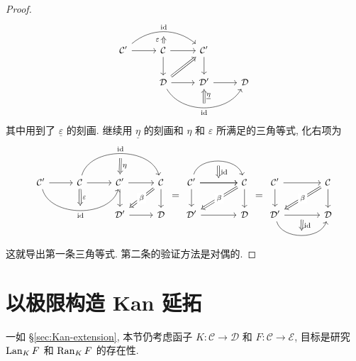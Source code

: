 \begin{proof}
\[\begin{tikzcd}[every cell/.append style = {font = \small}]
		\mathcal{C}' \arrow[r] \arrow[rr, bend left=40, "\identity", ""' {name=T}] & \mathcal{C} \arrow[r] \arrow[d] \arrow[Rightarrow, to=T, "\varepsilon" inner sep=0.4em] & \mathcal{C}' \arrow[d] & \\
 		& \mathcal{D} \arrow[r] \arrow[rr, bend right=60, "\identity"', "" {name=I}] \arrow[Rightarrow, ru] & \mathcal{D}' \arrow[r] \arrow[Rightarrow, from=I, "\underline{\eta}"'] & \mathcal{D}
	\end{tikzcd}\]
	其中用到了 $\underline{\varepsilon}$ 的刻画. 继续用 $\underline{\eta}$ 的刻画和 $\eta$ 和 $\varepsilon$ 所满足的三角等式, 化右项为
	\[\begin{tikzcd}[every cell/.append style = {font = \small}]
		\mathcal{C}' \arrow[r] \arrow[rr, bend right=75, "\identity"', "" {name=A}] & \mathcal{C} \arrow[r] \arrow[rr, bend left=75, "\identity", ""' {name=B}] \arrow[Rightarrow, to=A, "\varepsilon"] & \mathcal{C}' \arrow[r] \arrow[d] \arrow[Rightarrow, from=B, "\eta"] & \mathcal{C} \arrow[d] \arrow[Rightarrow, ld, "\beta" description] \\
		& & \mathcal{D}' \arrow[r] & \mathcal{D}
	\end{tikzcd} = \begin{tikzcd}[column sep=large, every cell/.append style = {font = \small}]
		\mathcal{C}' \arrow[r] \arrow[bend left=75, r, ""' {name=T}] \arrow[r, "" {name=B}] \arrow[d] & \mathcal{C} \arrow[d] \arrow[Rightarrow, ld, "\beta" description] \\
		\mathcal{D}' \arrow[r] & \mathcal{D} \arrow[Rightarrow, from=T, to=B, "\identity"] 
	\end{tikzcd} = \begin{tikzcd}[column sep=large, every cell/.append style = {font = \small}]
		\mathcal{C}' \arrow[r] \arrow[d] & \mathcal{C} \arrow[d]  \arrow[Rightarrow, ld, "\beta" description] \\
		\mathcal{D}' \arrow[r, ""' {name=T}] \arrow[r, bend right=75, "" {name=B}] & \mathcal{D} \arrow[Rightarrow, from=T, to=B, "\identity"] 
	\end{tikzcd}\]
	这就导出第一条三角等式. 第二条的验证方法是对偶的.
\end{proof}

\section{以极限构造 Kan 延拓}\label{sec:Kan-as-limit}
一如 \S\ref{sec:Kan-extension}, 本节仍考虑函子 $K: \mathcal{C} \to \mathcal{D}$ 和 $F: \mathcal{C} \to \mathcal{E}$, 目标是研究 $\operatorname{Lan}_K F$ 和 $\operatorname{Ran}_K F$ 的存在性.

